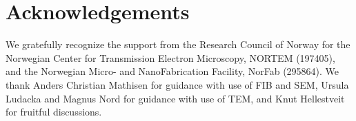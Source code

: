 \section{Acknowledgements}

We gratefully recognize the support from the Research Council of Norway for the Norwegian Center for Transmission Electron Microscopy, NORTEM (197405), and the Norwegian Micro- and NanoFabrication Facility, NorFab (295864). We thank Anders Christian Mathisen for guidance with use of FIB and SEM, Ursula Ludacka and Magnus Nord for guidance with use of TEM, and Knut Hellestveit for fruitful discussions.